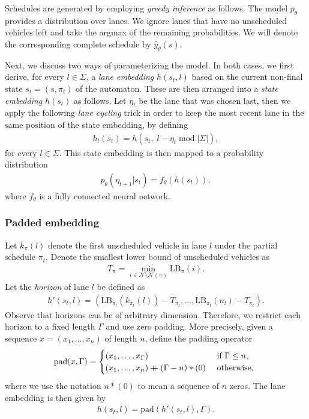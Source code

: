 \documentclass[a4paper]{article}
\newcommand\mdoubleplus{\mathbin{+\mkern-10mu+}}
\theoremstyle{definition}
\theoremstyle{plain}
\begin{document}
Schedules are generated by employing \textit{greedy inference} as follows. The
model $p_{\theta}$ provides a distribution over lanes. We ignore lanes that have
no unscheduled vehicles left and take the argmax of the remaining probabilities.
We will denote the corresponding complete schedule by $\hat{y}_{\theta}(s)$.

Next, we discuss two ways of parameterizing the model. In both cases, we first
derive, for every $l \in \Sigma$, a \textit{lane embedding} $h(s_{t}, l)$ based on the current
non-final state $s_{t} = (s, \pi_{t})$ of the automaton. These are then arranged
into a \textit{state embedding} $h(s_{t})$ as follows. Let $\eta_{t}$ be the lane that was
chosen last, then we apply the following \textit{lane cycling} trick in order to keep the
most recent lane in the same position of the state embedding, by defining
\begin{align*}
  h_{l}(s_{t}) = h(s_{t}, \; l - \eta_{t} \; \mathrm{mod} \; |\Sigma|) ,
\end{align*}
for every $l \in \Sigma$.
%
This state embedding is then mapped to a probability distribution
\begin{align*}
  p_{\theta}(\eta_{t+1} | s_{t}) = f_{\theta}(h(s_{t})) ,
\end{align*}
where $f_{\theta}$ is a fully connected neural network.


\subsubsection*{Padded embedding}
%
Let $k_{\pi}(l)$ denote the first unscheduled vehicle in lane $l$ under the partial schedule $\pi_{t}$.
Denote the smallest lower bound of unscheduled vehicles as
\begin{align*}
  T_{\pi} = \min_{i \in \mathcal{N} \setminus \mathcal{N}(\pi)} \text{LB}_{\pi}(i) .
\end{align*}
Let the \textit{horizon} of lane $l$ be defined as
\begin{align*}
  h'(s_{t}, l) = ( \text{LB}_{\pi_{t}}(k_{\pi_{t}}(l)) - T_{\pi_{t}}, \dots, \text{LB}_{\pi_{t}}(n_{l}) - T_{\pi_{t}} ) .
\end{align*}
%
Observe that horizons can be of arbitrary dimension. Therefore, we restrict each
horizon to a fixed length $\Gamma$ and use zero padding. More precisely, given a
sequence $x = (x_{1}, \dots, x_{n})$ of length $n$, define the padding
operator
\begin{align*}
  \text{pad}(x, \Gamma) = \begin{cases}
                            (x_{1}, \dots, x_{\Gamma}) &\text{ if } \Gamma \leq n,  \\
                            (x_{1}, \dots, x_{n}) \mdoubleplus (\Gamma - n) * (0) &\text{ otherwise, }
                            \end{cases}
\end{align*}
where we use the notation $n * (0)$ to mean a sequence of $n$ zeros.
%
The lane embedding is then given by
\begin{align*}
  h(s_{t}, l) = \text{pad}(h'(s_{t}, l), \Gamma).
\end{align*}
%
\end{document}
